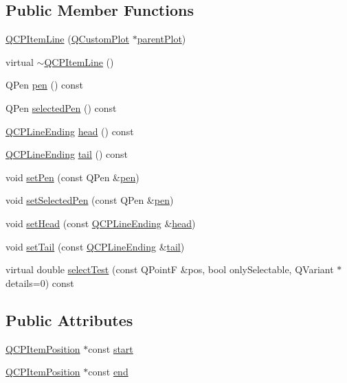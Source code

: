 \subsection*{Public Member Functions}
\begin{DoxyCompactItemize}
\item 
\hyperlink{classQCPItemLine_a17804b7f64961c6accf25b61e85142e3}{Q\+C\+P\+Item\+Line} (\hyperlink{classQCustomPlot}{Q\+Custom\+Plot} $\ast$\hyperlink{classQCPLayerable_ab7e0e94461566093d36ffc0f5312b109}{parent\+Plot})
\item 
virtual \hyperlink{classQCPItemLine_a94b5aaae048171e5306dc4695b991283}{$\sim$\+Q\+C\+P\+Item\+Line} ()
\item 
Q\+Pen \hyperlink{classQCPItemLine_a235779dd079a263bedb20b3daecc40eb}{pen} () const 
\item 
Q\+Pen \hyperlink{classQCPItemLine_a9fde5e95a1a369008252e18f1925650c}{selected\+Pen} () const 
\item 
\hyperlink{classQCPLineEnding}{Q\+C\+P\+Line\+Ending} \hyperlink{classQCPItemLine_a5f6cbc5c763feae9dfbce71748fc43f1}{head} () const 
\item 
\hyperlink{classQCPLineEnding}{Q\+C\+P\+Line\+Ending} \hyperlink{classQCPItemLine_a5d2ca0f784933e80f3e6e1d15dceebb3}{tail} () const 
\item 
void \hyperlink{classQCPItemLine_a572528dab61c1abe205822fbd5db4b27}{set\+Pen} (const Q\+Pen \&\hyperlink{classQCPItemLine_a235779dd079a263bedb20b3daecc40eb}{pen})
\item 
void \hyperlink{classQCPItemLine_a3e2fec44503277e77717e9c24f87f1ea}{set\+Selected\+Pen} (const Q\+Pen \&\hyperlink{classQCPItemLine_a235779dd079a263bedb20b3daecc40eb}{pen})
\item 
void \hyperlink{classQCPItemLine_aebf3d687114d584e0459db6759e2c3c3}{set\+Head} (const \hyperlink{classQCPLineEnding}{Q\+C\+P\+Line\+Ending} \&\hyperlink{classQCPItemLine_a5f6cbc5c763feae9dfbce71748fc43f1}{head})
\item 
void \hyperlink{classQCPItemLine_ac264222c3297a7efe33df9345c811a5f}{set\+Tail} (const \hyperlink{classQCPLineEnding}{Q\+C\+P\+Line\+Ending} \&\hyperlink{classQCPItemLine_a5d2ca0f784933e80f3e6e1d15dceebb3}{tail})
\item 
virtual double \hyperlink{classQCPItemLine_a7541e5d9378ca121d07b0df3b24f7178}{select\+Test} (const Q\+PointF \&pos, bool only\+Selectable, Q\+Variant $\ast$details=0) const 
\end{DoxyCompactItemize}
\subsection*{Public Attributes}
\begin{DoxyCompactItemize}
\item 
\hyperlink{classQCPItemPosition}{Q\+C\+P\+Item\+Position} $\ast$const \hyperlink{classQCPItemLine_a602da607a09498b0f152ada1d6851bc5}{start}
\item 
\hyperlink{classQCPItemPosition}{Q\+C\+P\+Item\+Position} $\ast$const \hyperlink{classQCPItemLine_a15598864c1c22a2497a1979c4980c4e1}{end}
\end{DoxyCompactItemize}
